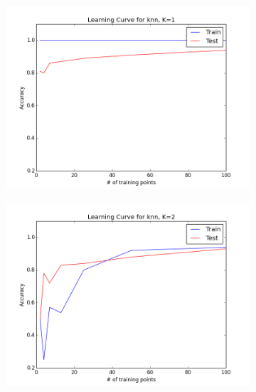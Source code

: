 \documentclass{article}
\begin{document}
	\begin{figure} [h!]
		\begin{subfigure} [h!]{.4\textwidth}
		\includegraphics[scale = .45]{LC_k1.png}
		\end{subfigure}
		\hfill
		\begin{subfigure} [h!]{.4\textwidth}
		\includegraphics[scale = .45]{LC_k2.png}
		\end{subfigure}
		\\
		\begin{subfigure} [h!]{.4\textwidth}

\end{subfigure}
\end{figure}
\end{document}
